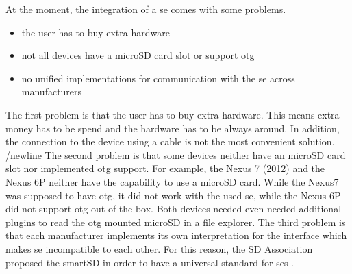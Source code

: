 At the moment, the integration of a \gls{se} comes with some problems.
\begin{itemize}
  \item the user has to buy extra hardware
  \item not all devices have a microSD card slot or support \gls{otg}
  \item no unified implementations for communication with the \gls{se} across manufacturers
\end{itemize}
The first problem is that the user has to buy extra hardware.
This means extra money has to be spend and the hardware has to be always around.
In addition, the connection to the device using a cable is not the most convenient solution.
/newline
The second problem is that some devices neither have an microSD card slot nor implemented \gls{otg} support.
For example, the Nexus 7 (2012) and the Nexus 6P neither have the capability to use a microSD card.
While the Nexus7 was supposed to have \gls{otg}, it did not work with the used \gls{se}, while the Nexus 6P did not support \gls{otg} out of the box.
Both devices needed even needed additional plugins to read the \gls{otg} mounted microSD in a file explorer.
The third problem is that each manufacturer implements its own interpretation for the interface which makes \gls{se} incompatible to each other.
For this reason, the SD Association proposed the smartSD in order to have a universal standard for \gls{se}s \cite{smartSD}.
